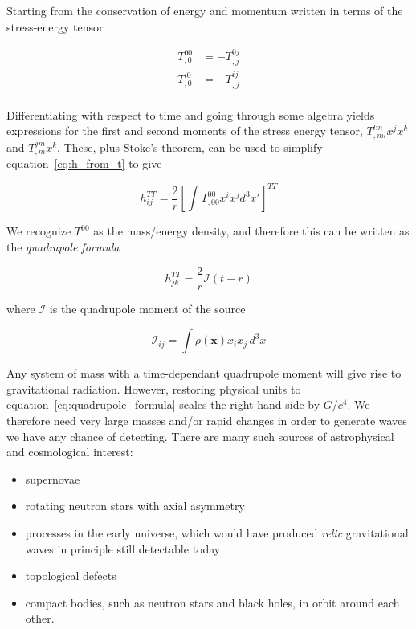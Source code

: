 Starting from the conservation of energy and momentum written in terms
of the stress-energy tensor

\begin{align*}
T^{00}_{,0} &= - T^{0j}_{,j} \\
T^{i0}_{,0} &= - T^{ij}_{,j} \\
\end{align*}

Differentiating with respect to time and going through some algebra
yields expressions for the first and second moments of the stress
energy tensor, $T^{lm}_{,ml} x^j x^k$ and $T^{jm}_{,m} x^k$.  These,
plus Stoke's theorem, can be used to simplify
equation~\ref{eq:h_from_t} to give

\begin{equation*}
h^{TT}_{ij} = \frac{2}{r} \left[
\int T^{00}_{,00} x^i x^j d^3 x' \right]^{TT}
\end{equation*}

We recognize $T^{00}$ as the mass/energy density, and therefore this
can be written as the \emph{quadrapole formula}

\begin{equation}
\label{eq:quadrupole_formula}
h^{TT}_{jk} = \frac{2}{r} \ddot{\mathcal{I}}(t-r)
\end{equation}

where $\mathcal{I}$ is the quadrupole moment of the source

\begin{equation*}
\mathcal{I}_{ij} = \int \rho(\mathbf{x})x_i x_j\,d^3 x
\end{equation*}


Any system of mass with a time-dependant quadrupole moment will give
rise to gravitational radiation.  However, restoring physical units to
equation~\ref{eq:quadrupole_formula} scales the right-hand side by
$G/c^4$.  We therefore need very large masses and/or rapid changes in
order to generate waves we have any chance of detecting.  There are
many such sources of astrophysical and cosmological interest:

\begin{itemize}
\item supernovae
\item rotating neutron stars with axial asymmetry
\item processes in the early universe, which would have produced
\emph{relic} gravitational waves in principle still detectable today
\item topological defects
\item compact bodies, such as neutron stars and black holes, in 
orbit around each other.
\end{itemize}

